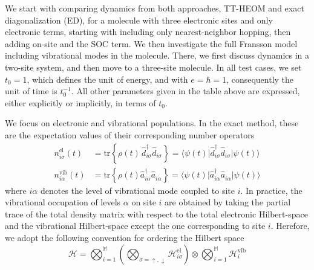 \documentclass{article}
\newcommand{\pdagger}{{\phantom{\dagger}}}
\newcommand{\tr}[1]{\mathrm{tr}\left\{#1\right\}}
\newcommand{\expc}[3]{\langle #1\vert #2 \vert #3\rangle}
\begin{document}
We start with comparing dynamics from both approaches, TT-HEOM and exact diagonalization (ED), for a molecule with three electronic sites and only electronic terms, starting with including only nearest-neighbor hopping, then adding on-site and the SOC term. We then investigate the full Fransson model including vibrational modes in the molecule. There, we first discuss dynamics in a two-site system, and then move to a three-site molecule. In all test cases, we set $t_0=1$, which defines the unit of energy, and with $e=\hbar=1$, consequently the unit of time is $t_0^{-1}$. All other parameters given in the table above are expressed, either explicitly or implicitly, in terms of $t_0$. 

We focus on electronic and vibrational populations. 
In the exact method, these are the expectation values of their corresponding number operators
\begin{align}
	n^\mathrm{el}_{i\sigma}(t) &= \tr{\rho(t) \, \hat{d}^\dagger_{i\sigma}\hat{d}^\pdagger_{i\sigma}} = \expc{\psi(t)}{\hat{d}^\dagger_{i\sigma}\hat{d}^\pdagger_{i\sigma}}{\psi(t)}\\
	n^\mathrm{vib}_{i\alpha}(t) &= \tr{\rho(t)\hat{a}_{i\alpha}^\dagger\hat{a}_{i\alpha}^\pdagger}= \expc{\psi(t)}{\hat{a}^\dagger_{i\alpha}\hat{a}^\pdagger_{i\alpha}}{\psi(t)} 
\end{align}
where $i\alpha$ denotes the level of vibrational mode coupled to site $i$. In practice, the vibrational occupation of levels $\alpha$ on site $i$ are obtained by taking the partial trace of the total density matrix with respect to the total electronic Hilbert-space and the vibrational Hilbert-space except the one corresponding to site $i$. Herefore, we adopt the following convention for ordering the Hilbert space
\begin{equation}
	\mathcal{H} = \bigotimes_{i=1}^{\mathds{M}} \left(\bigotimes_{\sigma = \uparrow,\downarrow} \mathcal{H}^\mathrm{el}_{i\sigma}\right) \otimes \bigotimes_{i=1}^\mathds{M}\mathcal{H}^\mathrm{vib}_i
\end{equation}
\end{document}

